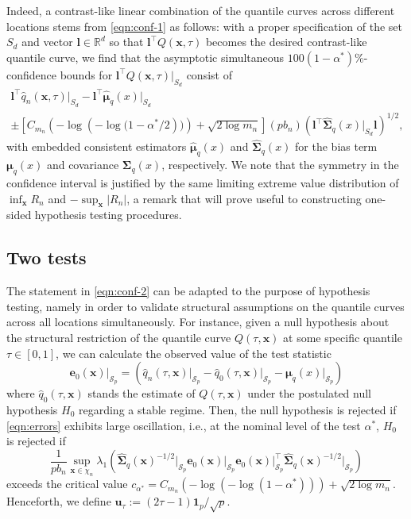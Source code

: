 \documentclass[aos]{imsart}
\theoremstyle{plain}
\theoremstyle{remark}
\def\R{\mathbb{R}}
\newcommand{\Scal}{\mathcal{S}}
\newcommand{\abs}[1]{\left\lvert #1 \right\rvert}
\newcommand{\bb}[1]{\boldsymbol{#1}}
\newcommand{\tr}{^{\intercal}}
\newcommand{\cnam}[1]{\textcolor{mypurple}{#1}}
\begin{document}
Indeed, a contrast-like linear combination of the quantile curves across different locations stems from \eqref{eqn:conf-1} as follows: with a proper specification of the set $S_d$ and vector $\bb{l} \in \R^d$ so that $\bb{l}\tr Q(\bb{x}, \tau)$ becomes the desired contrast-like quantile curve, we find that the asymptotic simultaneous $100(1-\alpha^*)\%$-confidence bounds for $\bb{l}\tr Q(\bb{x}, \tau)\vert_{S_d}$ consist of
\begin{multline*}
    \bb{l}\tr \hat{q}_n(\bb{x}, \tau)\vert_{S_d} - \bb{l}\tr\widehat{\bb{\mu}}_q(x)\vert_{S_d} \\
    \pm \left[ C_{m_n}\left(-\log\left(-\log(1-\alpha^*/2\right))\right) + \sqrt{2 \log m_n} \right] (pb_n) \left( \bb{l}\tr \widehat{\bb{\Sigma}}_q(x)\vert_{S_d} \bb{l} \right)^{1/2},
\end{multline*}
with embedded consistent estimators $\widehat{\bb{\mu}}_q(x)$ and $\widehat{\bb{\Sigma}}_q(x)$ for the bias term $\bb{\mu}_q(x)$ and covariance $\bb{\Sigma}_q(x)$, respectively. We note that the symmetry in the confidence interval is justified by the same limiting extreme value distribution of $\inf_{\bb{x}}R_n$ and $-\sup_{\bb{x}}\abs{R_n}$, a remark that will prove useful to constructing one-sided hypothesis testing procedures.

\subsection{Two tests}

The statement in \eqref{eqn:conf-2} \cnam{can be adapted to the purpose of hypothesis testing, namely in order to} validate structural assumptions on the quantile curves across all locations simultaneously. For instance, given a null hypothesis about the structural restriction of the quantile curve $Q(\tau, \bb{x})$ at some specific quantile $\tau \in [0, 1]$, we can calculate the observed value of the test statistic
\begin{equation}\label{eqn:errors}
    \bb{e}_0(\bb{x})\vert_{\Scal_p} = (\hat{q}_n(\tau, \bb{x})\vert_{\Scal_p} - \hat{q}_0(\tau, \bb{x})\vert_{\Scal_p} - \bb{\mu}_q(x)\vert_{\Scal_p} )
\end{equation}
where $\hat{q}_0(\tau, \bb{x})$ stands the estimate of $Q(\tau, \bb{x})$ under the postulated null hypothesis $H_0$ regarding a stable regime. Then, the null hypothesis is rejected if \eqref{eqn:errors} exhibits large oscillation, i.e., at the nominal level of the test $\alpha^*$, $H_0$ is rejected if
\begin{equation*}
    \dfrac{1}{pb_n}\sup_{\bb{x} \in \chi_n} \lambda_1\left( \widehat{\bb{\Sigma}}_q(\bb{x})^{-1/2}\vert_{\Scal_p} \bb{e}_0(\bb{x})\vert_{\Scal_p}\bb{e}_0(\bb{x})\vert_{\Scal_p}\tr \widehat{\bb{\Sigma}}_q(\bb{x})^{-1/2}\vert_{\Scal_p} \right)
\end{equation*}
exceeds the critical value $c_{\alpha^*}=C_{m_n}\left(-\log\left(-\log(1-\alpha^*)\right)\right) + \sqrt{2 \log m_n}$. \cnam{Henceforth, we define $\bb{u}_{\tau} := (2\tau-1) \bb{1}_p/\sqrt{p}$.}
\end{document}

